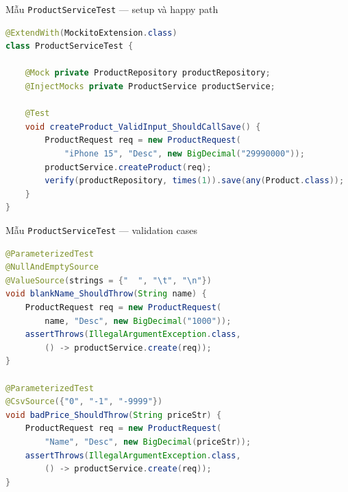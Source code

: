 \documentclass[aspectratio=169,12pt]{beamer}
\begin{document}
\begin{frame}[fragile,shrink=6]{Mẫu \texttt{ProductServiceTest} --- setup và happy path}
\begin{lstlisting}[language=java,basicstyle=\ttfamily\footnotesize,numbers=none]
@ExtendWith(MockitoExtension.class)
class ProductServiceTest {

    @Mock private ProductRepository productRepository;
    @InjectMocks private ProductService productService;

    @Test
    void createProduct_ValidInput_ShouldCallSave() {
        ProductRequest req = new ProductRequest(
            "iPhone 15", "Desc", new BigDecimal("29990000"));
        productService.createProduct(req);
        verify(productRepository, times(1)).save(any(Product.class));
    }
}
\end{lstlisting}
\end{frame}

\begin{frame}[fragile,shrink=9]{Mẫu \texttt{ProductServiceTest} --- validation cases}
\begin{lstlisting}[language=java,basicstyle=\ttfamily\footnotesize,numbers=none]
@ParameterizedTest
@NullAndEmptySource
@ValueSource(strings = {"  ", "\t", "\n"})
void blankName_ShouldThrow(String name) {
    ProductRequest req = new ProductRequest(
        name, "Desc", new BigDecimal("1000"));
    assertThrows(IllegalArgumentException.class,
        () -> productService.create(req));
}

@ParameterizedTest
@CsvSource({"0", "-1", "-9999"})
void badPrice_ShouldThrow(String priceStr) {
    ProductRequest req = new ProductRequest(
        "Name", "Desc", new BigDecimal(priceStr));
    assertThrows(IllegalArgumentException.class,
        () -> productService.create(req));
}
\end{lstlisting}
\end{frame}
\end{document}
